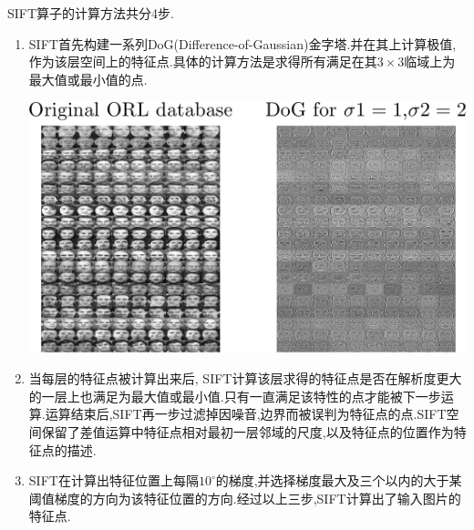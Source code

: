 SIFT算子的计算方法共分4步.
\begin{enumerate}
	\item SIFT首先构建一系列DoG(Difference-of-Gaussian)金字塔.并在其上计算极值,作为该层空间上的特征点.具体的计算方法是求得所有满足在其$3 \times 3$临域上为最大值或最小值的点. 

	 	\begin{center}
		\begin{minipage}[t]{\linewidth}
		\center
		{
		\includegraphics[width=\textwidth]{Img/c3/dog_demo} 
		}
		\end{minipage}
		\medskip
		\end{center}
	
	\item 当每层的特征点被计算出来后, SIFT计算该层求得的特征点是否在解析度更大的一层上也满足为最大值或最小值.只有一直满足该特性的点才能被下一步运算.运算结束后,SIFT再一步过滤掉因噪音,边界而被误判为特征点的点.SIFT空间保留了差值运算中特征点相对最初一层邻域的尺度,以及特征点的位置作为特征点的描述.
	\item SIFT在计算出特征位置上每隔$10^\circ$的梯度,并选择梯度最大及三个以内的大于某阈值梯度的方向为该特征位置的方向.经过以上三步,SIFT计算出了输入图片的特征点.
	

\end{enumerate}
